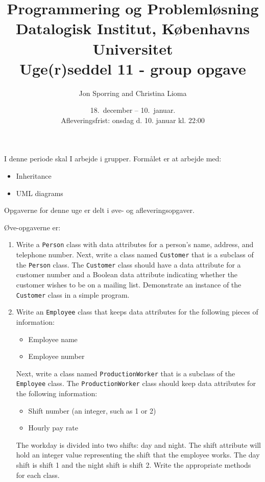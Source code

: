 \documentclass[a4paper,12pt]{article}
\title{Programmering og Problemløsning\\Datalogisk Institut,
  Københavns Universitet\\Uge(r)seddel 11 - group opgave}
\author{Jon Sporring and Christina Lioma}
\date{18.\ december -- 10.\ januar.\\Afleveringsfrist: onsdag d. 10. januar kl. 22:00}
\begin{document}
\maketitle

I denne periode skal I arbejde i grupper. 
Formålet er at arbejde med:
\begin{itemize}
\item Inheritance
\item UML diagrams
\end{itemize}

Opgaverne for denne uge er delt i øve- og afleveringsopgaver. 

Øve-opgaverne er:
\begin{enumerate}[label=11ø.\arabic*,start=0]

\item Write a \texttt{Person} class with data attributes for a person's name, address, and telephone number. Next, write a class named \texttt{Customer} that is a subclass of the \texttt{Person} class. The \texttt{Customer} class should have a data attribute for a customer number and a Boolean data attribute indicating whether the customer wishes to be on a mailing list. Demonstrate an instance of the \texttt{Customer} class in a simple program.
  
\item Write an \texttt{Employee} class that keeps data attributes for the following pieces of information: 
  \begin{itemize}
  \item Employee name
  \item Employee number
  \end{itemize}
  Next, write a class named \texttt{ProductionWorker} that is a subclass of the \texttt{Employee} class. The \texttt{ProductionWorker} class should keep data attributes for the following information:
  \begin{itemize}
  \item Shift number (an integer, such as 1 or 2)
  \item Hourly pay rate
  \end{itemize}
  The workday is divided into two shifts: day and night. The shift attribute will hold an integer value representing the shift that the employee works. The day shift is shift 1 and the night shift is shift 2. Write the appropriate methods for each class.
  

\end{enumerate}
\end{document}
